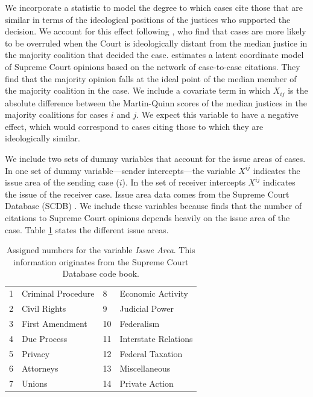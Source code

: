 \documentclass[headsepline=true, abstracton]{scrartcl}
\begin{document}
We incorporate a statistic to model the degree to which cases cite those that are similar in terms of the ideological positions of the justices who supported the decision. We account for this effect following \citet{spriggs2001explaining}, who find that cases are more likely to be overruled when the Court is ideologically distant from the median justice in the majority coalition that decided the case. \citet{clark2010locating} estimates a latent coordinate model of Supreme Court opinions based on the network of case-to-case citations. They find that the majority opinion falls at the ideal point of the median member of the majority coalition in the case. We include a covariate term in which $X_{ij}$ is the absolute difference between the Martin-Quinn scores \citep{martin2002dynamic} of the median justices in the majority coalitions for cases $i$ and $j$. We expect this variable to have a negative effect, which would correspond to cases citing those to which they are ideologically similar.%

We include two sets of dummy variables that account for the issue areas of cases. In one set of dummy variable---sender intercepts---the variable $X^{ij}$ indicates the issue area of the sending case ($i$). In the set of receiver intercepts $X^{ij}$ indicates the issue of the receiver case. Issue area data comes from the Supreme Court Database (SCDB) \citep{spaeth2014supreme}. We include these variables because \citet{cross2010determinants} finds that the number of citations to Supreme Court opinions depends heavily on the issue area of the case. Table \ref{issue_area_coding} states the different issue areas.

\begin{table}[]
\centering
\begin{tabular}{llll}
1 & Criminal Procedure & 8  & Economic Activity    \\
2 & Civil Rights       & 9  & Judicial Power       \\
3 & First Amendment    & 10 & Federalism           \\
4 & Due Process        & 11 & Interstate Relations \\
5 & Privacy            & 12 & Federal Taxation     \\
6 & Attorneys          & 13 & Miscellaneous        \\
7 & Unions             & 14 & Private Action      
\end{tabular}
\caption{Assigned numbers for the variable \textit{Issue Area}. This information originates from the Supreme Court Database code book.}
\label{issue_area_coding}
\end{table}
\end{document}
